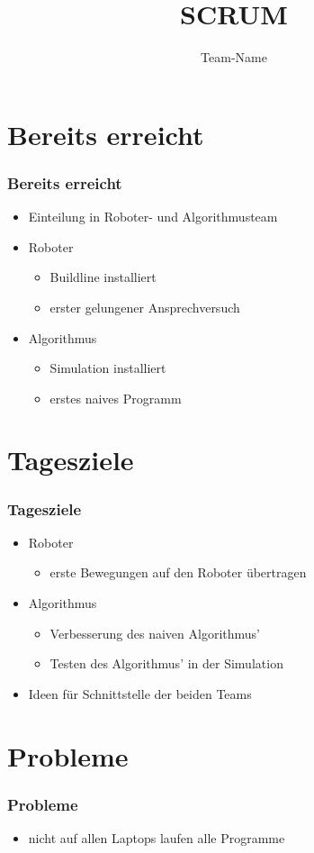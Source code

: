 \documentclass[ddcfooter,nototalpage]{tudbeamer}
\begin{document}
\title{SCRUM}
\author{Team-Name}
\maketitle

\section{Bereits erreicht}
\begin{frame}
\frametitle{Bereits erreicht}
\begin{itemize}
\item Einteilung in Roboter- und Algorithmusteam
\item Roboter
\begin{itemize}
\item Buildline installiert
\item erster gelungener Ansprechversuch
\end{itemize}
\item Algorithmus
\begin{itemize}
\item Simulation installiert
\item erstes naives Programm
\end{itemize}
\end{itemize}
\end{frame}

\section{Tagesziele}
\begin{frame}
\frametitle{Tagesziele}
\begin{itemize}
\item Roboter
\begin{itemize}
\item erste Bewegungen auf den Roboter übertragen
\end{itemize}
\item Algorithmus
\begin{itemize}
\item Verbesserung des naiven Algorithmus'
\item Testen des Algorithmus' in der Simulation
\end{itemize}
\item Ideen für Schnittstelle der beiden Teams
\end{itemize}
\end{frame}

\section{Probleme}
\begin{frame}
\frametitle{Probleme}
\begin{itemize}
\item nicht auf allen Laptops laufen alle Programme
\end{itemize}
\end{frame}
\end{document}
